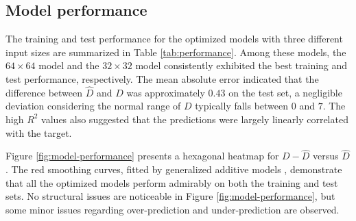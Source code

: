 \documentclass[]{interact}
\theoremstyle{plain}%
\theoremstyle{definition}
\theoremstyle{remark}
\begin{document}
\begin{table}

\caption{\label{tab:best-hyperparameter}Hyperparameters values for the optimized computer vision models with different input sizes.}
\centering
{}
\end{table}

\hypertarget{model-performance}{%
\subsection{Model performance}\label{model-performance}}

The training and test performance for the optimized models with three
different input sizes are summarized in Table \ref{tab:performance}.
Among these models, the \(64 \times 64\) model and the \(32 \times 32\)
model consistently exhibited the best training and test performance,
respectively. The mean absolute error indicated that the difference
between \(\hat{D}\) and \(D\) was approximately \(0.43\) on the test
set, a negligible deviation considering the normal range of \(D\)
typically falls between \(0\) and \(7\). The high \(R^2\) values also
suggested that the predictions were largely linearly correlated with the
target.

Figure \ref{fig:model-performance} presents a hexagonal heatmap for
\(D - \hat{D}\) versus \(\hat{D}\). The red smoothing curves, fitted by
generalized additive models \citep{hastie2017generalized}, demonstrate
that all the optimized models perform admirably on both the training and
test sets. No structural issues are noticeable in Figure
\ref{fig:model-performance}, but some minor issues regarding
over-prediction and under-prediction are observed.
\end{document}
